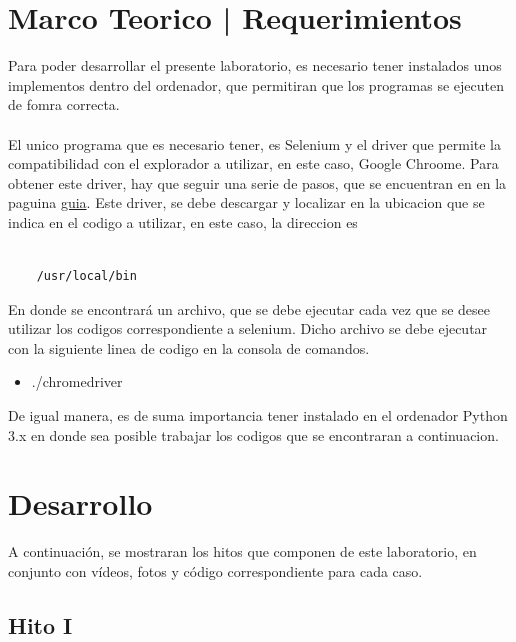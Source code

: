 \documentclass[]{article}
\begin{document}
\section{Marco Teorico | Requerimientos}
Para poder desarrollar el presente laboratorio, es necesario tener instalados unos implementos dentro del ordenador, que permitiran
que los programas se ejecuten de fomra correcta. 
\\\\
El unico programa que es necesario tener, es Selenium y el driver que permite la compatibilidad con el explorador a utilizar, en este caso, 
Google Chroome. Para obtener este driver, hay que seguir una serie de pasos, que se encuentran en en la paguina \href{https://sites.google.com/chromium.org/driver/}{guia}.
Este driver, se debe descargar y localizar en la ubicacion que se indica en el codigo a utilizar, en este caso, la direccion es 
\\\\
\begin{verbatim}
    /usr/local/bin
\end{verbatim}
En donde se encontrará un archivo, que se debe ejecutar cada vez que se desee utilizar los codigos correspondiente a selenium. Dicho archivo se debe ejecutar
con la siguiente linea de codigo en la consola de comandos. 
\begin{itemize}
    \item ./chromedriver
\end{itemize}
De igual manera, es de suma importancia tener instalado en el ordenador Python 3.x en donde sea posible trabajar los codigos que se encontraran a continuacion. 


\newpage
\section{Desarrollo}
    A continuación, se mostraran los hitos que componen de este laboratorio, en conjunto con vídeos,
    fotos y código correspondiente para cada caso. 

\subsection{Hito I}
\end{document}
